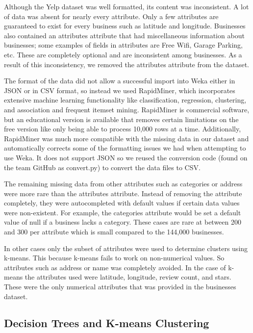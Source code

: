 \quad Although the Yelp dataset was well formatted, its content was inconsistent. A lot of data was absent for nearly every attribute. Only a few attributes are guaranteed to exist for every business such as latitude and longitude. Businesses also contained an attributes attribute that had miscellaneous information about businesses; some examples of fields in attributes are Free Wifi, Garage Parking, etc. These are completely optional and are inconsistent among businesses. As a result of this inconsistency, we removed the attributes attribute from the dataset.

\quad The format of the data did not allow a successful import into Weka either in JSON or in CSV format, so instead we used RapidMiner, which incorporates extensive machine learning functionality like classification, regression, clustering, and association and frequent itemset mining. RapidMiner is commercial software, but an educational version is available that removes certain limitations on the free version like only being able to process 10,000 rows at a time. Additionally, RapidMiner was much more compatible with the missing data in our dataset and automatically corrects some of the formatting issues we had when attempting to use Weka. It does not support JSON so we reused the conversion code (found on the team GitHub as convert.py) to convert the data files to CSV.

\quad The remaining missing data from other attributes such as categories or address were more rare than the attributes attribute. Instead of removing the attribute completely, they were autocompleted with default values if certain data values were non-existent. For example, the categories attribute would be set a default value of null if a business lacks a category. These cases are rare at between 200 and 300 per attribute which is small compared to the 144,000 businesses.

\quad In other cases only the subset of attributes were used to determine clusters using k-means. This because k-means fails to work on non-numerical values. So attributes such as address or name was completely avoided. In the case of k-means the attributes used were latitude, longitude, review count, and stars. These were the only numerical attributes that was provided in the businesses dataset.

\subsection{Decision Trees and K-means Clustering}

